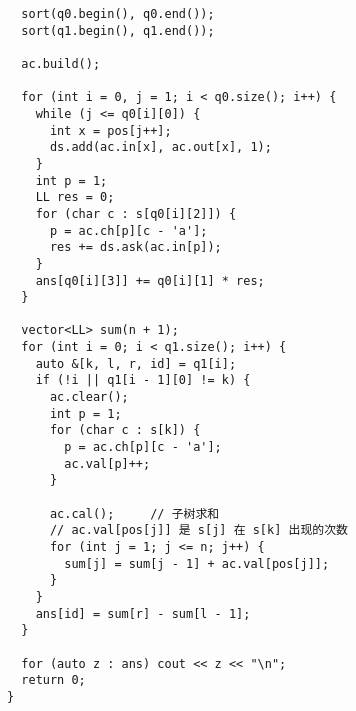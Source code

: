 \begin{verbatim}
  sort(q0.begin(), q0.end());
  sort(q1.begin(), q1.end());

  ac.build();
  
  for (int i = 0, j = 1; i < q0.size(); i++) {
    while (j <= q0[i][0]) {
      int x = pos[j++];
      ds.add(ac.in[x], ac.out[x], 1);
    }
    int p = 1;
    LL res = 0;
    for (char c : s[q0[i][2]]) {
      p = ac.ch[p][c - 'a'];
      res += ds.ask(ac.in[p]);
    }
    ans[q0[i][3]] += q0[i][1] * res;
  }

  vector<LL> sum(n + 1);
  for (int i = 0; i < q1.size(); i++) {
    auto &[k, l, r, id] = q1[i];
    if (!i || q1[i - 1][0] != k) {
      ac.clear();
      int p = 1;
      for (char c : s[k]) {
        p = ac.ch[p][c - 'a'];
        ac.val[p]++;
      }
      
      ac.cal();     // 子树求和
      // ac.val[pos[j]] 是 s[j] 在 s[k] 出现的次数
      for (int j = 1; j <= n; j++) {
        sum[j] = sum[j - 1] + ac.val[pos[j]];
      }
    }
    ans[id] = sum[r] - sum[l - 1];
  }

  for (auto z : ans) cout << z << "\n";
  return 0;
}
\end{verbatim}